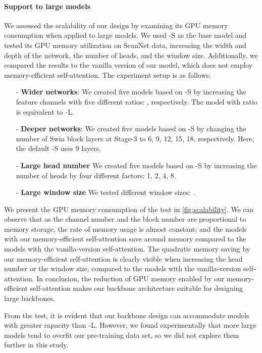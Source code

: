 \documentclass[10pt,twocolumn,letterpaper]{article}
\begin{document}
\paragraph{Support to large models} We assessed the scalability of our design by examining its GPU memory consumption when applied to large models. We used \SST-S as the base model and tested its GPU memory utilization on ScanNet data, increasing the width and depth of the network, the number of heads, and the window size. Additionally, we compared the results to the vanilla version of our model, which does not employ memory-efficient self-attention.  The experiment setup is as follows:
\begin{enumerate}[leftmargin=*]\item[-]\textbf{Wider networks}:  We created five models based on \SST-S by increasing the feature channels with five different ratios: , respectively. The model with ratio  is equivalent to \SST-L.
    \item[-]\textbf{Deeper networks}: We created five models based on \SST-S by changing the number of Swin block layers at Stage-3 to 6, 9, 12, 15, 18, respectively. Here, the default \SST-S uses 9 layers.
    \item[-]\textbf{Large head number} We created five models based on \SST-S by increasing the number of heads by four different factors: 1, 2, 4, 8.
    \item[-]\textbf{Large window size} We tested different window sizes: .
\end{enumerate}
We present the GPU memory consumption of the test in \cref{fig:scalability}. We can observe that as the channel number and the block number are proportional to memory storage, the rate of memory usage is almost constant; and the models with our memory-efficient self-attention save around  memory compared to the models with the vanilla-version self-attention. The quadratic memory saving by our memory-efficient self-attention is clearly visible when increasing the head number or the window size, compared to the models with the vanilla-version self-attention. In conclusion, the reduction of GPU memory enabled by our memory-efficient self-attention makes our backbone architecture suitable for designing large backbones.

From the test, it is evident that our backbone design can accommodate models with greater capacity than \SST-L. However, we found experimentally that more large models tend to overfit our pre-training data set, so we did not explore them further in this study.
\end{document}
